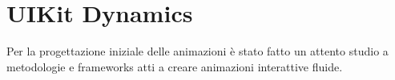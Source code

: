 






\section{UIKit Dynamics}

Per la progettazione iniziale delle animazioni è stato fatto un attento studio a metodologie e frameworks
atti a creare animazioni interattive fluide.

